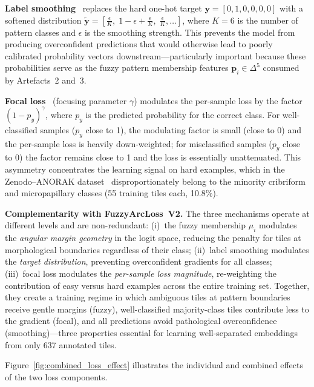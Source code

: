 \textbf{Label smoothing}~\cite{szegedy2016rethinking}
replaces the hard one-hot target
$\mathbf{y} = [0, 1, 0, 0, 0, 0]$ with a softened distribution
$\tilde{\mathbf{y}} = [\tfrac{\epsilon}{K},\;
1 - \epsilon + \tfrac{\epsilon}{K},\;
\tfrac{\epsilon}{K}, \ldots]$,
where $K = 6$ is the number of pattern classes and $\epsilon$ is
the smoothing strength.
This prevents the model from producing overconfident predictions
that would otherwise lead to poorly calibrated probability vectors
downstream---particularly important because these probabilities
serve as the fuzzy pattern membership features
$\mathbf{p}_i \in \Delta^5$ consumed by Artefacts~2 and~3.

\textbf{Focal loss}~\cite{lin2017focal}
(focusing parameter $\gamma$) modulates the
per-sample loss by the factor $(1 - p_y)^\gamma$, where $p_y$ is
the predicted probability for the correct class.
For well-classified samples ($p_y$ close to 1), the modulating factor
is small (close to 0) and the per-sample loss is heavily
down-weighted; for misclassified samples ($p_y$ close to 0) the
factor remains close to 1 and the loss is essentially unattenuated.
This asymmetry concentrates the learning signal on hard examples,
which in the Zenodo--ANORAK dataset~\cite{anorak2024}
disproportionately belong to the minority cribriform and
micropapillary classes (55 training tiles each, 10.8\%).

\textbf{Complementarity with FuzzyArcLoss~V2.}
The three mechanisms operate at different levels and are
non-redundant:
(i)~the fuzzy membership $\mu_i$ modulates the \emph{angular margin
geometry} in the logit space, reducing the penalty for tiles at
morphological boundaries regardless of their class;
(ii)~label smoothing modulates the \emph{target distribution},
preventing overconfident gradients for all classes;
(iii)~focal loss modulates the \emph{per-sample loss magnitude},
re-weighting the contribution of easy versus hard examples across
the entire training set.
Together, they create a training regime in which ambiguous tiles
at pattern boundaries receive gentle margins (fuzzy), well-classified
majority-class tiles contribute less to the gradient (focal), and
all predictions avoid pathological overconfidence (smoothing)---three
properties essential for learning well-separated embeddings from
only 637 annotated tiles.

Figure~\ref{fig:combined_loss_effect} illustrates the individual
and combined effects of the two loss components.

